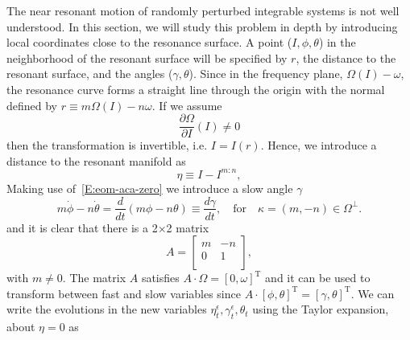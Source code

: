 The near resonant motion of randomly perturbed integrable systems is not well understood. In this section, we will study this problem in depth by introducing local coordinates close to the resonance surface. A point ($I,\phi,\theta$) in the neighborhood of the resonant surface will be specified by $r$, the distance to the resonant surface, and the angles ($\gamma,\theta$). Since in the frequency plane, $\Omega(I)-\omega$, the resonance curve forms a straight line through the origin with the normal defined by $r \equiv m \Omega(I) - n \omega$. If we assume
\[
\frac{\partial \Omega}{\partial I} (I) \neq 0
\]
then the transformation is invertible, i.e. $I=I(r)$. Hence, we introduce a distance to the resonant manifold as
\[
\eta \equiv I - I^{m:n},
\]
Making use of~\eqref{E:eom-aca-zero} we introduce a slow angle $\gamma$
\[
m \dot \phi - n \dot \theta = \frac{d}{dt} \left(m \phi - n \theta \right) \equiv \frac{d \gamma}{dt}, \quad \text{for} \quad \kappa =(m,-n) \in \Omega^{\perp}.
\]
and it is clear that there is a 2$\times$2 matrix
\[
A = \left[
\begin{array}{cc} m & -n \\ 0 & 1 \\ \end{array} \right],
\]
with $m \neq 0$. The matrix $A$ satisfies $A \cdot \Omega = [0, \omega]^\text{T}$ and it can be used to transform between fast and slow variables since $A \cdot [\phi, \theta]^\text{T} = [\gamma, \theta]^\text{T}$. We can write the evolutions in the new variables $\eta_t^\epsilon,\gamma_t^\epsilon,\theta_t$ using the Taylor expansion, about $\eta = 0$ as
